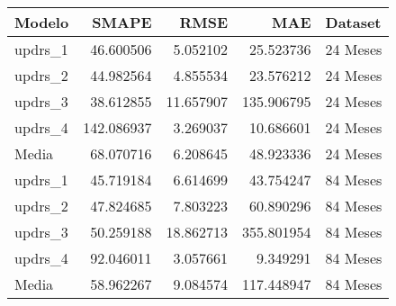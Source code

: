 \begin{tabular}{lrrrl}
\toprule
Modelo & SMAPE & RMSE & MAE & Dataset \\
\midrule
updrs_1 & 46.600506 & 5.052102 & 25.523736 & 24 Meses \\
updrs_2 & 44.982564 & 4.855534 & 23.576212 & 24 Meses \\
updrs_3 & 38.612855 & 11.657907 & 135.906795 & 24 Meses \\
updrs_4 & 142.086937 & 3.269037 & 10.686601 & 24 Meses \\
Media & 68.070716 & 6.208645 & 48.923336 & 24 Meses \\
updrs_1 & 45.719184 & 6.614699 & 43.754247 & 84 Meses \\
updrs_2 & 47.824685 & 7.803223 & 60.890296 & 84 Meses \\
updrs_3 & 50.259188 & 18.862713 & 355.801954 & 84 Meses \\
updrs_4 & 92.046011 & 3.057661 & 9.349291 & 84 Meses \\
Media & 58.962267 & 9.084574 & 117.448947 & 84 Meses \\
\bottomrule
\end{tabular}
